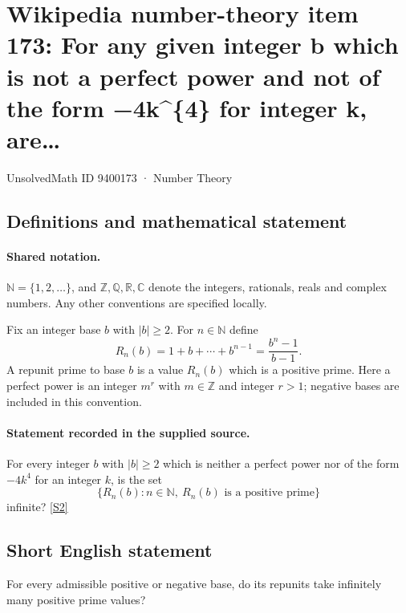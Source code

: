 \documentclass[11pt]{article}
\newcommand{\sref}[2]{\hyperlink{source:#1:#2}{[S#2]}}
\begin{document}
\setcounter{section}{9400172}
\section{Wikipedia number-theory item 173: For any given integer b which is not a perfect power and not of the form −4k\textasciicircum{}\{4\} for integer k, are…}\label{9400173}
{\small\sffamily UnsolvedMath ID 9400173 · Number Theory}
\subsection{Definitions and mathematical statement}

\paragraph{Shared notation.}$\mathbb N=\{1,2,\ldots\}$, and $\mathbb Z,\mathbb Q,\mathbb R,\mathbb C$ denote the integers, rationals, reals and complex numbers. Any other conventions are specified locally.


Fix an integer base $b$ with $|b|\ge2$. For $n\in\mathbb N$ define
\[R_n(b)=1+b+\cdots+b^{n-1}=\frac{b^n-1}{b-1}.\]
A repunit prime to base $b$ is a value $R_n(b)$ which is a positive prime. Here a perfect power is an integer $m^r$ with $m\in\mathbb Z$ and integer $r>1$; negative bases are included in this convention.
\paragraph{Statement recorded in the supplied source.}
For every integer $b$ with $|b|\ge2$ which is neither a perfect power nor of the form $-4k^4$ for an integer $k$, is the set
\[\{R_n(b):n\in\mathbb N,\ R_n(b)\text{ is a positive prime}\}\]
infinite? \sref{9400173}{2}
\subsection{Short English statement}
For every admissible positive or negative base, do its repunits take infinitely many positive prime values?
\end{document}
